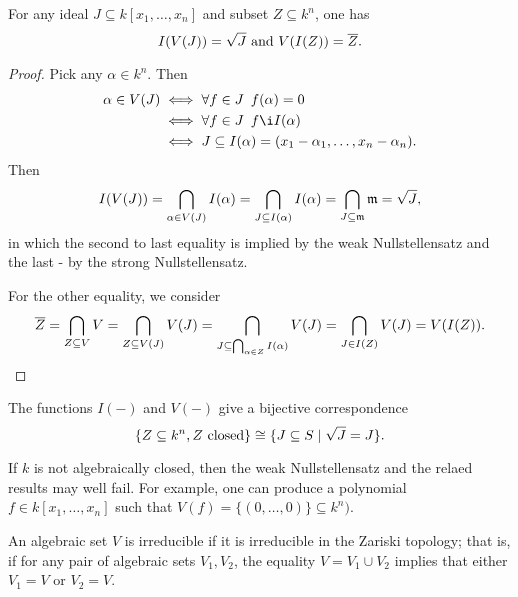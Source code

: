 \begin{theorem}
  \label{algebraic set nullstellensatz}
  For any ideal \(J \subseteq k[x_1, \dotsc, x_n]\) and subset \(Z \subseteq k^n\), one has
  \[I(V(J)) = \sqrt{J} \text{ and } V(I(Z)) = \overline{Z}.\]
\end{theorem}
\begin{proof}
  Pick any \(\alpha \in k^n.\) Then
  \begin{align*}
    \alpha \in V(J) & \iff \forall f \in J \enspace f(\alpha) = 0 \\
                    & \iff \forall f \in J \enspace f \i I(\alpha) \\
                    & \iff J \subseteq I(\alpha) = (x_1 - \alpha_1, \dotsc, x_n - \alpha_n).
  \end{align*}
  Then
  \[I(V(J)) = \bigcap_{\alpha \in V(J)} I(\alpha) = \bigcap_{J \subseteq I(\alpha)} I(\alpha) = \bigcap_{J \subseteq \mathfrak m} \mathfrak m = \sqrt{J},\]
  in which the second to last equality is implied by the weak Nullstellensatz and the last - by the strong Nullstellensatz.

  For the other equality, we consider
  \[\overline{Z} = \bigcap_{Z \subseteq V} V = \bigcap_{Z \subseteq V(J)} V(J) = \bigcap_{J \subseteq \bigcap_{\alpha \in Z} I(\alpha)} V(J) = \bigcap_{J \in I(Z)} V(J) = V(I(Z)).\]
\end{proof}

\begin{corollary}
  \label{closed in bijection with radical}
  The functions \(I(-)\) and \(V(-)\) give a bijective correspondence
  \[\{Z \subseteq k^n, \text{$Z$ closed}\} \cong \{J \subseteq S \mathrel{|} \sqrt{J} = J\}.\]
\end{corollary}

\begin{note}
  If \(k\) is not algebraically closed, then the weak Nullstellensatz and the relaed results may well fail. For example, one can produce a polynomial \(f \in k[x_1, \dotsc, x_n]\) such that
  \(V(f) = \{(0, \dotsc, 0)\} \subseteq k^n).\)
\end{note}

\begin{df}
  An algebraic set \(V\) is irreducible if it is irreducible in the Zariski topology; that is, if for any pair of algebraic sets \(V_1, V_2\), the equality \(V = V_1 \cup V_2\) implies that either \(V_1 = V\) or \(V_2 = V.\)
\end{df}

